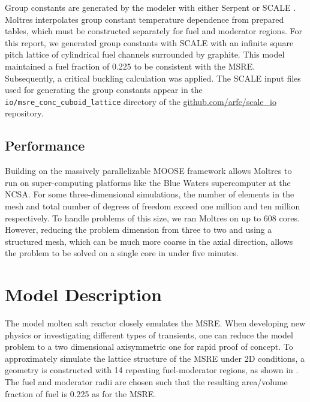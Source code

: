 \documentclass{article}
\let\Oldsection\section
\renewcommand{\section}{\FloatBarrier\Oldsection}
\let\Oldsubsection\subsection
\renewcommand{\subsection}{\FloatBarrier\Oldsubsection}
\newcommand{\code}[1]{\texttt{#1}}
\begin{document}
Group constants are generated by the modeler with either Serpent
\cite{leppanen_serpent_2015} or SCALE \cite{dehart_reactor_2011}. Moltres 
interpolates group constant temperature dependence from prepared tables, which must be
constructed separately for fuel and moderator regions. For this report,
we generated group constants with SCALE with
an infinite square pitch lattice of cylindrical fuel channels surrounded by
graphite. This model maintained a fuel fraction of 0.225 to be consistent with the
\gls{MSRE}. Subsequently, a critical buckling calculation was applied. The SCALE
input files used for generating the group constants appear in the
\code{io/msre\_conc\_cuboid\_lattice} directory of the
\url{github.com/arfc/scale_io} repository.

\subsection{Performance}

Building on the massively parallelizable \gls{MOOSE} framework allows Moltres
to run on super-computing platforms like the Blue Waters supercomputer at the 
\gls{NCSA}. For some
three-dimensional simulations, the number of
elements in the mesh and total number of degrees of freedom exceed one million
and ten million respectively. To handle problems of this size, we ran Moltres
on up to 608 cores. However, reducing the problem dimension from three to
two and using a structured mesh, which can be much more coarse in the axial
direction, allows the problem to be solved on a single core in under
five minutes.

\section{Model Description}

The model molten salt reactor closely emulates the \gls{MSRE}. When developing new physics or investigating
different types of transients, one can reduce the model problem to a two
dimensional axisymmetric one for rapid proof of concept. To approximately simulate the lattice
structure of the \gls{MSRE} under 2D conditions, a geometry is constructed with 14 repeating
fuel-moderator regions, as shown in . The fuel and moderator
radii are chosen such that the resulting area/volume fraction of fuel is 0.225 as
for the \gls{MSRE}.
\end{document}
